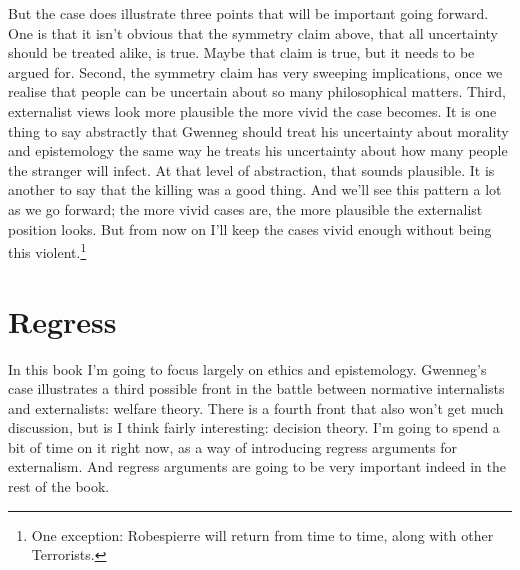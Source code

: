 \documentclass[
  10pt,
  letterpaper,
  twoside]{scrbook}
\begin{document}
But the case does illustrate three points that will be important going
forward. One is that it isn't obvious that the symmetry claim above,
that all uncertainty should be treated alike, is true. Maybe that claim
is true, but it needs to be argued for. Second, the symmetry claim has
very sweeping implications, once we realise that people can be uncertain
about so many philosophical matters. Third, externalist views look more
plausible the more vivid the case becomes. It is one thing to say
abstractly that {Gwenneg} should treat his uncertainty about morality
and epistemology the same way he treats his uncertainty about how many
people the stranger will infect. At that level of abstraction, that
sounds plausible. It is another to say that the killing was a good
thing. And we'll see this pattern a lot as we go forward; the more vivid
cases are, the more plausible the externalist position looks. But from
now on I'll keep the cases vivid enough without being this
violent.\footnote{One exception: {Robespierre} will return from time to
  time, along with other Terrorists.}

\section{Regress}\label{regress}

In this book I'm going to focus largely on ethics and epistemology.
{Gwenneg}'s case illustrates a third possible front in the battle
between normative internalists and externalists: welfare theory. There
is a fourth front that also won't get much discussion, but is I think
fairly interesting: decision theory. I'm going to spend a bit of time on
it right now, as a way of introducing regress arguments for externalism.
And regress arguments are going to be very important indeed in the rest
of the book.
\end{document}
